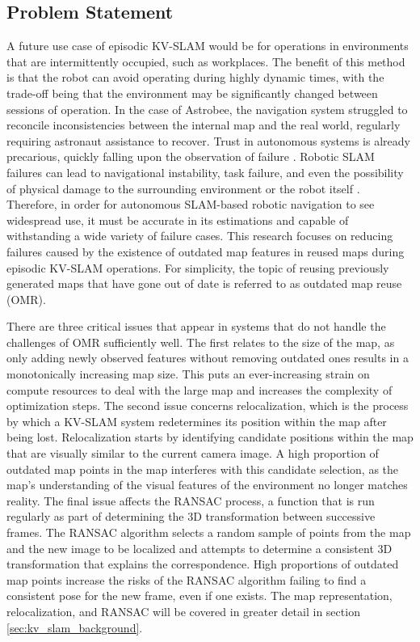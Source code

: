 \subsection{Problem Statement}

A future use case of episodic KV-SLAM would be for operations in environments that are intermittently occupied, such as workplaces. The benefit of this method is that the robot can avoid operating during highly dynamic times, with the trade-off being that the environment may be significantly changed between sessions of operation. In the case of Astrobee, the navigation system struggled to reconcile inconsistencies between the internal map and the real world, regularly requiring astronaut assistance to recover. Trust in autonomous systems is already precarious, quickly falling upon the observation of failure \cite{robinetteEffectRobotPerformance2017}. Robotic SLAM failures can lead to navigational instability, task failure, and even the possibility of physical damage to the surrounding environment or the robot itself \cite{nahavandiComprehensiveReviewAutonomous2025}. Therefore, in order for autonomous SLAM-based robotic navigation to see widespread use, it must be accurate in its estimations and capable of withstanding a wide variety of failure cases. This research focuses on reducing failures caused by the existence of outdated map features in reused maps during episodic KV-SLAM operations. For simplicity, the topic of reusing previously generated maps that have gone out of date is referred to as outdated map reuse (OMR).

There are three critical issues that appear in systems that do not handle the challenges of OMR sufficiently well. The first relates to the size of the map, as only adding newly observed features without removing outdated ones results in a monotonically increasing map size. This puts an ever-increasing strain on compute resources to deal with the large map and increases the complexity of optimization steps. The second issue concerns relocalization, which is the process by which a KV-SLAM system redetermines its position within the map after being lost. Relocalization starts by identifying candidate positions within the map that are visually similar to the current camera image. A high proportion of outdated map points in the map interferes with this candidate selection, as the map's understanding of the visual features of the environment no longer matches reality. The final issue affects the RANSAC process, a function that is run regularly as part of determining the 3D transformation between successive frames. The RANSAC algorithm selects a random sample of points from the map and the new image to be localized and attempts to determine a consistent 3D transformation that explains the correspondence. High proportions of outdated map points increase the risks of the RANSAC algorithm failing to find a consistent pose for the new frame, even if one exists. The map representation, relocalization, and RANSAC will be covered in greater detail in section \ref{sec:kv_slam_background}.

